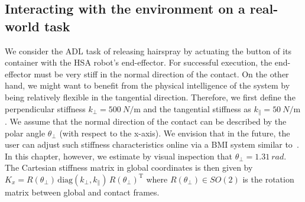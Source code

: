 \subsection{Interacting with the environment on a real-world task}\label{sub:braincontrol:experiments:adl}
We consider the \gls{ADL} task of releasing hairspray by actuating the button of its container with the \gls{HSA} robot's end-effector. For successful execution, the end-effector must be very stiff in the normal direction of the contact. On the other hand, we might want to benefit from the physical intelligence of the system by being relatively flexible in the tangential direction. Therefore, we first define the perpendicular stiffness $k_\perp = \SI{500}{N\per\meter}$ and the tangential stiffness as $k_\parallel = \SI{50}{N \per \meter}$. We assume that the normal direction of the contact can be described by the polar angle $\theta_\perp$ (with respect to the x-axis). We envision that in the future, the user can adjust such stiffness characteristics online via a \gls{BMI} system similar to~\cite{schiatti2017soft}. In this chapter, however, we estimate by visual inspection that $\theta_\perp=\SI{1.31}{rad}$.
The Cartesian stiffness matrix in global coordinates is then given by $K_x = R(\theta_\perp) \, \mathrm{diag}(k_\perp, k_\parallel) \, R(\theta_\perp)^\mathrm{T}$
where $R(\theta_\perp) \in SO(2)$ is the rotation matrix between global and contact frames.


